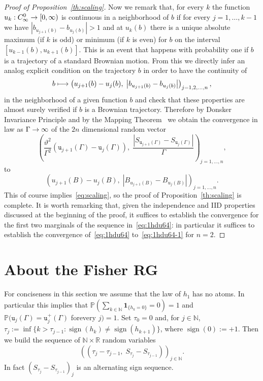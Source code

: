 \documentclass[10pt]{amsart}
\theoremstyle{definition}\newtheorem{defi}[theo]{Definition}\newtheorem{rema}[theo]{Remark}\newtheorem{exam}[theo]{Example}\newtheorem{exem}[theo]{Example}\newtheorem{nota}[theo]{Notation}
\newcommand{\ind}{\mathbf{1}}
\newcommand{\bbN}{\mathbb{N}}
\newcommand{\bbP}{\mathbb{P}}
\newcommand{\bbR}{\mathbb{R}}
\newcommand{\gG}{\Gamma}
\renewcommand*\ss{\mathtt{u}}
\newcommand{\tu}{\ss}
\newcommand{\tuplus}{\ss^+}
\DeclareMathOperator{\sign}{\mathrm{sign}}
\renewcommand*{\to}{\mathchoice{\longrightarrow}{\rightarrow}{\rightarrow}{\rightarrow}}
\let\oldmapsto\mapsto
\renewcommand*{\mapsto}{\mathchoice{\longmapsto}{\oldmapsto}{\oldmapsto}{\oldmapsto}}
\begin{document}
\begin{proof}[Proof of Proposition~\ref{th:scaling}]
Now we remark that, for every $k$ the function $u_k: C^0_\infty \to [0, \infty)$ is continuous in a neighborhood of $b$ if for every $j=1,\dots, k-1$ we have $| b_{u_{j+1}(b)}- b_{u_j (b)}| >1$ and at $u_k(b)$ there is a unique absolute maximum (if $k$ is odd) or minimum (if $k$ is even) for $b$ on the interval $[u_{k-1}(b), u_{k+1}(b)]$. This is an event that happens with probability one if $b$ is a trajectory of a standard Brownian motion. From this we directly infer an analog explicit condition on the trajectory $b$ in order to have the continuity of
\begin{equation}
b \mapsto
\left(u_{j+1}(b)-u_j(b),\; \left | b_{u_{j+1}(b)}-b_{u_{j}(b)}\right | \right)_{j=1,2, \dots, n},
\end{equation}
in the neighborhood of a given function $b$ and check that these properties are almost surely verified if $b$ is a Brownian trajectory. Therefore by {Donsker Invariance Principle} and by the {Mapping Theorem}~\cite[Theorem~2.7, Chapter~1]{cf:Bill} we obtain the convergence in law as $\gG\to \infty$ of the $2n$ dimensional random vector
\begin{equation}\label{eq:1hdu64}
\left(\frac{\vartheta^2}{ \gG ^2}\left(\tu_{j+1}(\gG) - \tu_j(\gG)\right), \;\frac{\left|S_{\tu_{j+1}(\gG)} - S_{\tu_j(\gG)}\right| }{ \gG }\right)_{j=1, \dots, n}
,
\end{equation}
to
\begin{equation}\label{eq:1hdu64-1}
\left(u_{j+1}(B)-u_j(B),\; \left|B_{u_{j+1}(B)}-B_{u_{j}(B)}\right|\right)_{j=1, \dots, n}.
\end{equation}
This of course implies~\eqref{eq:scaling}, so the proof of Proposition~\ref{th:scaling} is complete. It is worth remarking that, given the independence and IID properties discussed at the beginning of the proof, it suffices to establish the convergence for the first two marginals of the sequence in~\eqref{eq:1hdu64}: in particular it suffices to establish the convergence of~\eqref{eq:1hdu64} to~\eqref{eq:1hdu64-1} for $n=2$.
\end{proof}

\section{About the Fisher RG}\label{sec:RG}

For conciseness in this section we assume that the law of $h_1$ has no atoms. In particular this implies that $\bbP(\sum_{k\in \bbN}\ind_{\{h_k=0\}}=0)=1$ and $\bbP(\tu_j(\gG) =\tuplus_j(\gG)$ for\linebreak every $j)=1$. Set $\tau_0=0$ and, for $j \in \bbN$, $\tau_{j}:=\inf\{k> \tau_{j-1}: \sign(h_k) \neq \sign (h_{k+1})\}$, where $\sign(0):=+1$. Then we build the sequence of $\bbN \times \bbR$ random variables
\begin{equation}\label{eq:alt-signs}
\left(\left(\tau_{j}-\tau_{j-1},\; S_{\tau_{j}}-S_{\tau_{j-1}}\right)\right)_{j\in \bbN}.
\end{equation}
In fact $(S_{\tau_{j}}-S_{\tau_{j-1}})_j$ is an alternating sign sequence.
\end{document}

